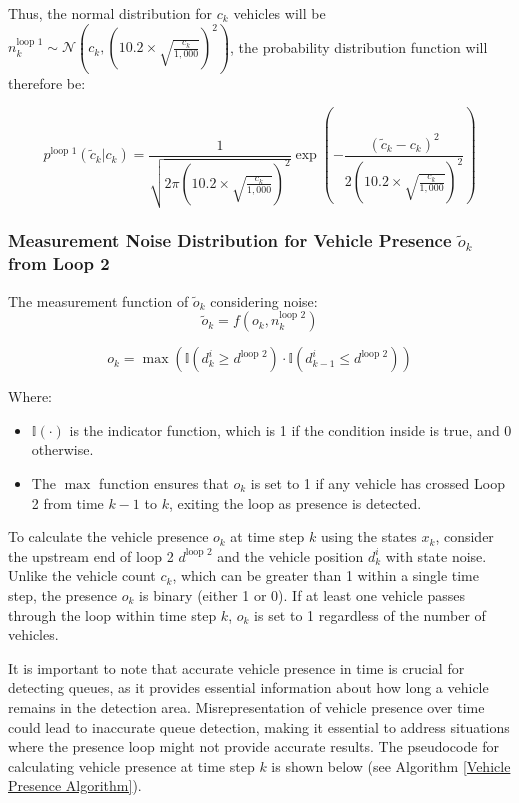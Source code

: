 Thus, the normal distribution for \(c_k\) vehicles will be \( n_k^\text{loop 1} \sim \mathcal{N}(c_k, (10.2 \times \sqrt{\frac{c_k}{1,000}})^2) \), the probability distribution function will therefore be:

\begin{equation}\label{probability distribution loop 1}
    p^\text{loop 1}(\tilde c_k | c_k) = \frac{1}{\sqrt{2 \pi (10.2 \times \sqrt{\frac{c_k}{1,000}})^2}} \exp\left(-\frac{(\tilde c_k - c_k)^2}{2 (10.2 \times \sqrt{\frac{c_k}{1,000}})^2}\right)
\end{equation}

\subsubsection{Measurement Noise Distribution for Vehicle Presence $\tilde o_k$ from Loop 2}
The measurement function of $\tilde o_k$ considering noise:
\begin{equation}
    \tilde o_k = f(o_k, n_k^\text{loop 2})
\end{equation}

\begin{equation}\label{VehiclePresence}
o_k = \max \left( \mathbb{I}(d_{k}^i \geq d^{\text{loop 2}}) \cdot \mathbb{I}(d_{k-1}^i \leq d^{\text{loop 2}}) \right)
\end{equation}

Where:
\begin{itemize}
    \item \(\mathbb{I}(\cdot)\) is the indicator function, which is 1 if the condition inside is true, and 0 otherwise.
    \item The \(\max\) function ensures that \(o_k\) is set to 1 if any vehicle has crossed Loop 2 from time \(k-1\) to \(k\), exiting the loop as presence is detected.
\end{itemize}

To calculate the vehicle presence \(o_k\) at time step \(k\) using the states \(x_k\), consider the upstream end of loop 2 \(d^{\text{loop 2}}\) and the vehicle position \(d_k^i\) with state noise. Unlike the vehicle count \(c_k\), which can be greater than 1 within a single time step, the presence \(o_k\) is binary (either 1 or 0). If at least one vehicle passes through the loop within time step \(k\), \(o_k\) is set to 1 regardless of the number of vehicles.

It is important to note that accurate vehicle presence in time is crucial for detecting queues, as it provides essential information about how long a vehicle remains in the detection area. Misrepresentation of vehicle presence over time could lead to inaccurate queue detection, making it essential to address situations where the presence loop might not provide accurate results. The pseudocode for calculating vehicle presence at time step \(k\) is shown below (see Algorithm \ref{Vehicle Presence Algorithm}).



